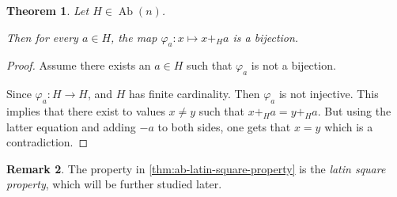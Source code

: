 \documentclass[a4paper, 12pt, english]{article}
\theoremstyle{plain}
\newtheorem{theorem}{Theorem}[section]
\theoremstyle{definition}
\newtheorem{remark}[theorem]{Remark}
\DeclareMathOperator{\Ab}{Ab}
\DeclareMathOperator{\Aut}{Aut}
\DeclareMathOperator{\Sym}{Sym}
\begin{document}


\begin{theorem} \label{thm:ab-latin-square-property}
    Let \( H \in \Ab(n) \).

    Then for every \( a \in H \), the map \( \varphi_a: x \mapsto x +_H a \) is a bijection.
\end{theorem}
\begin{proof}
    Assume there exists an \( a \in H \) such that \( \varphi_a \) is not a bijection.
    
    Since \( \varphi_a: H \to H \), and \( H \) has finite cardinality. Then \( \varphi_a \) is not injective. This implies that there exist to values \( x \neq y \) such that \( x +_H a = y +_H a \). But using the latter equation and adding \( -a \) to both sides, one gets that \( x = y \) which is a contradiction.
\end{proof}

\begin{remark}
    The property in \autoref{thm:ab-latin-square-property} is the \emph{latin square property}, which will be further studied later.
\end{remark}
\end{document}
